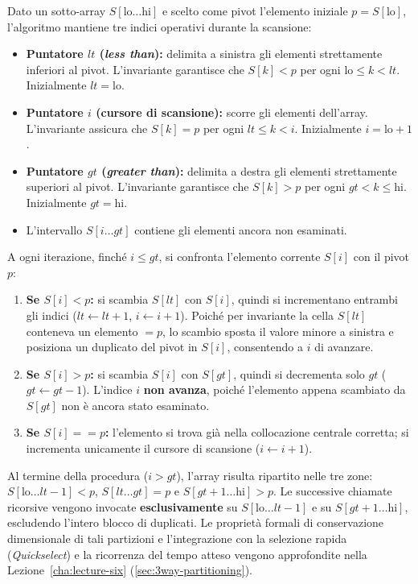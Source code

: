 Dato un sotto-array $S[\text{lo} \dots \text{hi}]$ e scelto come pivot l'elemento iniziale $p = S[\text{lo}]$, l'algoritmo mantiene tre indici operativi durante la scansione:
\begin{itemize}
  \item \textbf{Puntatore $lt$ (\textit{less than}):} delimita a sinistra gli elementi strettamente inferiori al pivot. L'invariante garantisce che $S[k] < p$ per ogni $\text{lo} \le k < lt$. Inizialmente $lt = \text{lo}$.
  \item \textbf{Puntatore $i$ (cursore di scansione):} scorre gli elementi dell'array. L'invariante assicura che $S[k] = p$ per ogni $lt \le k < i$. Inizialmente $i = \text{lo} + 1$.
  \item \textbf{Puntatore $gt$ (\textit{greater than}):} delimita a destra gli elementi strettamente superiori al pivot. L'invariante garantisce che $S[k] > p$ per ogni $gt < k \le \text{hi}$. Inizialmente $gt = \text{hi}$.
  \item L'intervallo $S[i \dots gt]$ contiene gli elementi ancora non esaminati.
\end{itemize}

A ogni iterazione, finché $i \le gt$, si confronta l'elemento corrente $S[i]$ con il pivot $p$:
\begin{enumerate}
  \item \textbf{Se $S[i] < p$:} si scambia $S[lt]$ con $S[i]$, quindi si incrementano entrambi gli indici ($lt \leftarrow lt + 1$, $i \leftarrow i + 1$). Poiché per invariante la cella $S[lt]$ conteneva un elemento $= p$, lo scambio sposta il valore minore a sinistra e posiziona un duplicato del pivot in $S[i]$, consentendo a $i$ di avanzare.
  \item \textbf{Se $S[i] > p$:} si scambia $S[i]$ con $S[gt]$, quindi si decrementa solo $gt$ ($gt \leftarrow gt - 1$). L'indice $i$ \textbf{non avanza}, poiché l'elemento appena scambiato da $S[gt]$ non è ancora stato esaminato.
  \item \textbf{Se $S[i] == p$:} l'elemento si trova già nella collocazione centrale corretta; si incrementa unicamente il cursore di scansione ($i \leftarrow i + 1$).
\end{enumerate}

Al termine della procedura ($i > gt$), l'array risulta ripartito nelle tre zone: $S[\text{lo} \dots lt-1] < p$, $S[lt \dots gt] = p$ e $S[gt+1 \dots \text{hi}] > p$. Le successive chiamate ricorsive vengono invocate \textbf{esclusivamente} su $S[\text{lo} \dots lt-1]$ e su $S[gt+1 \dots \text{hi}]$, escludendo l'intero blocco di duplicati. Le proprietà formali di conservazione dimensionale di tali partizioni e l'integrazione con la selezione rapida (\textit{Quickselect}) e la ricorrenza del tempo atteso vengono approfondite nella Lezione~\ref{cha:lecture-six} (\autoref{sec:3way-partitioning}).


